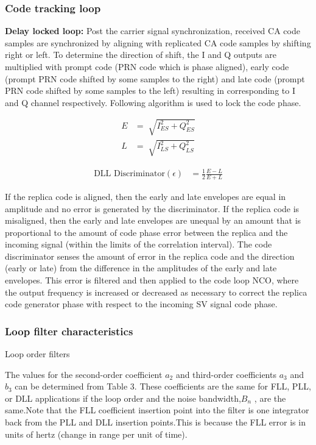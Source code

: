 \subsubsection{Code tracking loop}
\textbf{Delay locked loop:}
Post the carrier signal synchronization, received CA code samples are synchronized by aligning with replicated CA code samples by shifting right or left. To determine the direction of shift, the I and Q outputs are multiplied with prompt code (PRN code which is phase aligned), early code (prompt PRN code shifted by some samples to the right) and late code (prompt PRN code shifted by some samples to the left) resulting in corresponding to I and Q channel respectively. Following algorithm is used to lock the code phase.

\begin{align}
	E&=\sqrt[]{I_{ES}^2+Q_{ES}^2}\\
	L&=\sqrt[]{I_{LS}^2+Q_{LS}^2}
\end{align}

\begin{align}
	\text{DLL Discriminator} (\epsilon)&=\frac{1}{2}\frac{E-L}{E+L}
\end{align}

\noindent If the replica code is aligned, then the early and late envelopes are equal in amplitude and no error is generated by the discriminator. If the replica code is misaligned, then the early and late envelopes are unequal by an amount that is proportional to the amount of code phase error between the replica and the incoming signal (within the limits of the correlation interval). The code discriminator senses the amount of error in the replica code and the direction (early or late) from the difference in the amplitudes of the early and late envelopes. This
error is filtered and then applied to the code loop NCO, where the output frequency is increased or decreased as necessary to correct the replica code generator phase with respect to the incoming SV signal code phase.

\subsubsection{Loop filter characteristics}
\begin{table}[h]

\vspace{3mm}
\caption{Loop order filters}
\label{table:loop}
\end{table}
\noindent The values for the second-order coefficient $a_2$ and third-order coefficients $a_3$ and $b_3$ can be determined from Table 3. These coefficients are the same for FLL, PLL, or DLL applications if the loop
order and the noise bandwidth,$B_n$ , are the same.Note that the FLL coefficient insertion point into the filter is one integrator back from the PLL and DLL insertion points.This is because the FLL error is in units of hertz (change in range per unit of time).

